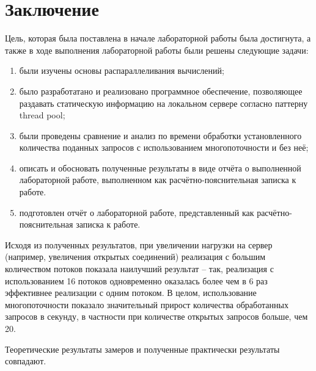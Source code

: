 \chapter*{Заключение}

Цель, которая была поставлена в начале лабораторной работы была достигнута, а также в ходе выполнения лабораторной работы были решены следующие задачи:

\begin{enumerate}[label=\arabic*)]
	\item были изучены основы распараллеливания вычислений;
	\item было разработатано и реализовано программное обеспечение, позволяющее раздавать статическую информацию на локальном сервере согласно паттерну thread pool;
	\item были проведены сравнение и анализ по времени обработки установленного количества поданных запросов с использованием многопоточности и без неё;
	\item описать и обосновать полученные результаты в виде отчёта о выполненной лабораторной работе, выполненном как расчётно-пояснительная записка к работе.
	\item подготовлен отчёт о лабораторной работе, представленный как расчётно-пояснительная записка к работе.
\end{enumerate}

Исходя из полученных результатов, при увеличении нагрузки на сервер (например, увеличения открытых соединений) реализация с большим количеством потоков показала наилучший результат -- так, реализация с использованием 16 потоков одновременно оказалась более чем в 6 раз эффективнее реализации с одним потоком.
В целом, использование многопоточности показало значительный прирост количества обработанных запросов в секунду, в частности при количестве открытых запросов больше, чем 20.


Теоретические результаты замеров и полученные практически результаты совпадают.